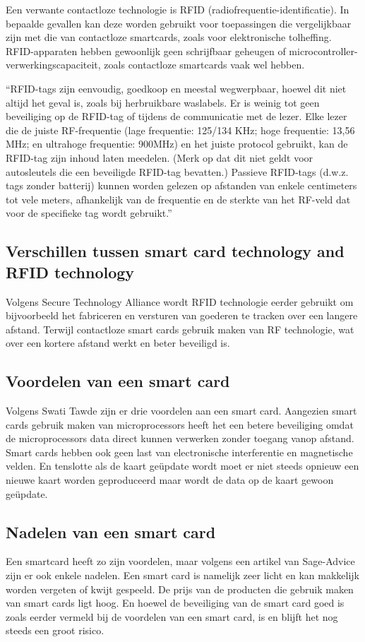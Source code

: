 Een verwante contactloze technologie is RFID (radiofrequentie-identificatie). In bepaalde gevallen kan deze worden gebruikt voor toepassingen die vergelijkbaar zijn met die van contactloze smartcards, zoals voor elektronische tolheffing. RFID-apparaten hebben gewoonlijk geen schrijfbaar geheugen of microcontroller-verwerkingscapaciteit, zoals contactloze smartcards vaak wel hebben.

``RFID-tags zijn eenvoudig, goedkoop en meestal wegwerpbaar, hoewel dit niet altijd het geval is, zoals bij herbruikbare waslabels. Er is weinig tot geen beveiliging op de RFID-tag of tijdens de communicatie met de lezer. Elke lezer die de juiste RF-frequentie (lage frequentie: 125/134 KHz; hoge frequentie: 13,56 MHz; en ultrahoge frequentie: 900MHz) en het juiste protocol gebruikt, kan de RFID-tag zijn inhoud laten meedelen. (Merk op dat dit niet geldt voor autosleutels die een beveiligde RFID-tag bevatten.) Passieve RFID-tags (d.w.z. tags zonder batterij) kunnen worden gelezen op afstanden van enkele centimeters tot vele meters, afhankelijk van de frequentie en de sterkte van het RF-veld dat voor de specifieke tag wordt gebruikt.''

\subsection{Verschillen tussen smart card technology and RFID technology}
Volgens Secure Technology Alliance  wordt RFID technologie eerder gebruikt om bijvoorbeeld het fabriceren en versturen van goederen te tracken over een langere afstand. Terwijl contactloze smart cards gebruik maken van RF technologie, wat over een kortere afstand werkt en beter beveiligd is.

\subsection{Voordelen van een smart card}
Volgens Swati Tawde zijn er drie voordelen aan een smart card. Aangezien smart cards gebruik maken van microprocessors heeft het een betere beveiliging omdat de microprocessors data direct kunnen verwerken zonder toegang vanop afstand. Smart cards hebben ook geen last van electronische interferentie en magnetische velden. En tenslotte als de kaart geüpdate wordt moet er niet steeds opnieuw een nieuwe kaart worden geproduceerd maar wordt de data op de kaart gewoon geüpdate.

\subsection{Nadelen van een smart card}
Een smartcard heeft zo zijn voordelen, maar volgens een artikel van Sage-Advice zijn er ook enkele nadelen. Een smart card is namelijk zeer licht en kan makkelijk worden vergeten of kwijt gespeeld. De prijs van de producten die gebruik maken van smart cards ligt hoog. En hoewel de beveiliging van de smart card goed is zoals eerder vermeld bij de voordelen van een smart card, is en blijft het nog steeds een groot risico.

